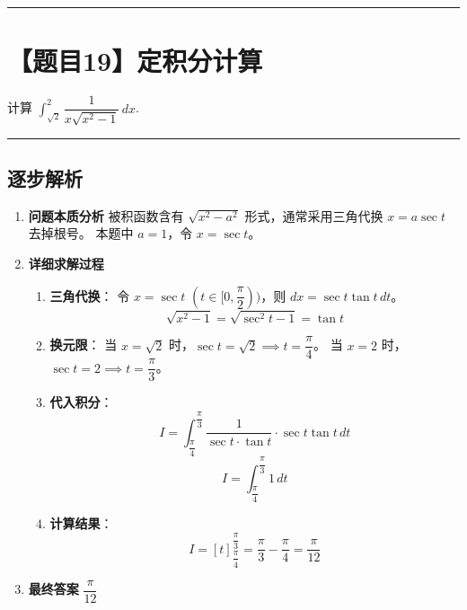 \documentclass[UTF8,10pt]{ctexart}
\newenvironment{redenv}{\color{red}}{}
\newenvironment{detailedanalysis}{%
    \color{red}
    \begin{enumerate}[label=\textbf{第\arabic*步：}, leftmargin=*, align=left, itemsep=0pt, parsep=0pt, topsep=0pt, partopsep=0pt]
}{%
    \end{enumerate}
}
\newcommand{\problemrule}{\par\filbreak\noindent\rule{\textwidth}{1.5pt}\vspace{-0.5em}}
\newcommand{\analysisrule}{\noindent\rule{\textwidth}{0.8pt}\vspace{-0.5em}}
\begin{document}
\problemrule
\section*{【题目19】定积分计算}
计算 $\int_{\sqrt{2}}^{2} \dfrac{1}{x\sqrt{x^2-1}}\, dx$.

\begin{redenv}
\analysisrule
\subsection*{逐步解析}

\begin{detailedanalysis}
\item \textbf{问题本质分析}
被积函数含有 $\sqrt{x^2-a^2}$ 形式，通常采用三角代换 $x = a\sec t$ 去掉根号。
本题中 $a=1$，令 $x = \sec t$。

\item \textbf{详细求解过程}
\begin{enumerate}[label=(\alph*)]
    \item \textbf{三角代换}：
    令 $x = \sec t$ $(t \in [0, \dfrac{\pi}{2}))$，则 $dx = \sec t \tan t \, dt$。
    \[ \sqrt{x^2-1} = \sqrt{\sec^2 t - 1} = \tan t \]
    \item \textbf{换元限}：
    当 $x = \sqrt{2}$ 时，$\sec t = \sqrt{2} \implies t = \dfrac{\pi}{4}$。
    当 $x = 2$ 时，$\sec t = 2 \implies t = \dfrac{\pi}{3}$。
    \item \textbf{代入积分}：
    \[ I = \int_{\dfrac{\pi}{4}}^{\dfrac{\pi}{3}} \dfrac{1}{\sec t \cdot \tan t} \cdot \sec t \tan t \, dt \]
    \[ I = \int_{\dfrac{\pi}{4}}^{\dfrac{\pi}{3}} 1 \, dt \]
    \item \textbf{计算结果}：
    \[ I = [t]_{\dfrac{\pi}{4}}^{\dfrac{\pi}{3}} = \dfrac{\pi}{3} - \dfrac{\pi}{4} = \dfrac{\pi}{12} \]
\end{enumerate}

\item \textbf{最终答案}
$\dfrac{\pi}{12}$
\end{detailedanalysis}


\end{redenv}
\end{document}
